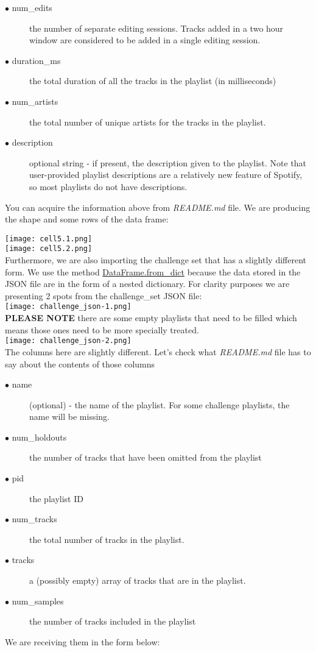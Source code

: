 \documentclass[]{article}
\begin{document}
\begin{description}
	\item[$\bullet$ num\_edits] the number of separate editing sessions. Tracks added in a two hour window are considered to be added in a single editing session.
	\item[$\bullet$ duration\_ms] the total duration of all the tracks in the playlist (in milliseconds)
	\item[$\bullet$ num\_artists] the total number of unique artists for the tracks in the playlist.
	\item[$\bullet$ description] optional string - if present, the description given to the playlist.  Note that user-provided playlist descriptions are a relatively new feature of Spotify, so most playlists do not have descriptions.
\end{description}
You can acquire the information above from \textit{README.md} file.
We are producing the shape and some rows of the data frame:

\texttt{[image: cell5.1.png]} \\
\texttt{[image: cell5.2.png]}
\\
Furthermore, we are also importing the challenge set that has a slightly different form. We use the method \href{https://pandas.pydata.org/docs/reference/api/pandas.DataFrame.from_dict.html}{DataFrame.from\_dict} because the data stored in the JSON file are in the form of a nested dictionary. For clarity purposes we are presenting 2 spots from the challenge\_set JSON file:
\\
\texttt{[image: challenge\_json-1.png]}
\\
\textbf{PLEASE NOTE} there are some empty playlists that need to be filled which means those ones need to be more specially treated.
\\
\texttt{[image: challenge\_json-2.png]}
\\
The columns here are slightly different. Let's check what \textit{README.md} file has to say about the contents of those columns
\begin{description}
	\item [$\bullet$ name] (optional) - the name of the playlist. For some challenge playlists, the name will be missing.
	\item [$\bullet$ num\_holdouts] the number of tracks that have been omitted from the playlist 
	\item [$\bullet$ pid] the playlist ID 
	\item [$\bullet$ num\_tracks] the total number of tracks in the playlist.
	\item [$\bullet$ tracks] a (possibly empty) array of tracks that are in the playlist.
	\item [$\bullet$ num\_samples] the number of tracks included in the playlist 
\end{description}
We are receiving them in the form below:
\end{document}
